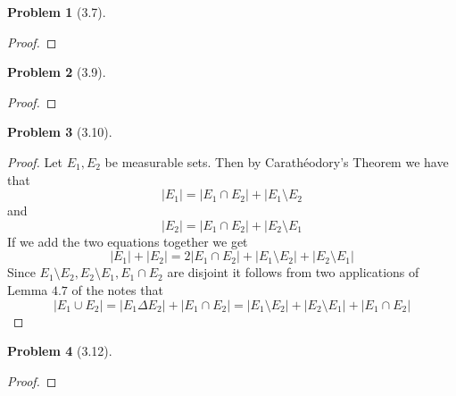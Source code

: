 \documentclass[10pt]{article}
\newcommand{\sk}{\vskip 10mm}
\theoremstyle{plain}
\newtheorem{problem}{Problem}
\theoremstyle{remark}
\begin{document}
\sk

\begin{problem}[3.7]

\end{problem}

\begin{proof}

\end{proof}

\sk

\begin{problem}[3.9]

\end{problem}

\begin{proof}

\end{proof}

\sk

\begin{problem}[3.10]

\end{problem}

\begin{proof}
  Let $E_1,E_2$ be measurable sets. Then by Carath\'eodory's Theorem we have that
  \[ |E_1| = |E_1\cap E_2| + |E_1\setminus E_2\]
  and
  \[ |E_2| = |E_1\cap E_2| + |E_2\setminus E_1\]
  If we add the two equations together we get
  \[ |E_1| + |E_2| = 2|E_1\cap E_2| + |E_1\setminus E_2| + |E_2\setminus E_1| \]
  Since $E_1\setminus E_2, E_2\setminus E_1, E_1\cap E_2$ are disjoint it follows
  from two applications of Lemma $4.7$ of the notes that
  \[|E_1\cup E_2| = |E_1\Delta E_2| + |E_1\cap E_2| = |E_1\setminus E_2| + |E_2\setminus E_1| + |E_1\cap E_2| \]
\end{proof}

\sk

\begin{problem}[3.12]

\end{problem}

\begin{proof}

\end{proof}

\sk
\end{document}
